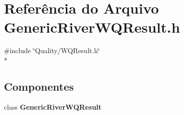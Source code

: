 \section{Referência do Arquivo Generic\+River\+W\+Q\+Result.\+h}
\label{_generic_river_w_q_result_8h}
{\ttfamily \#include \char`\"{}Quality/\+W\+Q\+Result.\+h\char`\"{}}\\*
\subsection*{Componentes}
\begin{DoxyCompactItemize}
\item 
class {\bf Generic\+River\+W\+Q\+Result}
\end{DoxyCompactItemize}
